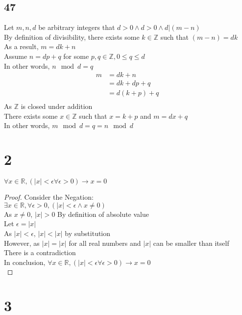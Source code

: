 \documentclass{article}
\begin{document}
\subsection{47}
Let $m,n, d$ be arbitrary integers that $d>0 \wedge d > 0 \wedge d|(m-n)$\\
By definition of divisibility, there exists some $k\in \mathbb{Z}$ such that $(m-n) = dk$\\
As a result, $m = dk + n$\\
Assume $n = dp + q$ for some $p,q\in \mathbb{Z}, 0 \leq q \leq d$\\
In other words, $n \mod d = q$\\
\begin{align*}
    m &= dk + n\\
    &= dk + dp + q \tag{By substitution}\\
    &= d(k + p) + q \tag{By algebra}\\
\end{align*}
As $\mathbb{Z}$ is closed under addition\\
There exists some $x \in \mathbb{Z}$ such that $x = k + p$ and $m = dx + q$\\
In other words, $m \mod d = q = n \mod d$\\
\section{2}
$\forall x \in \mathbb{R}, (|x| < \epsilon \forall \epsilon > 0) \rightarrow x = 0$\\
\begin{proof}
Consider the Negation:\\
$\exists x \in \mathbb{R}, \forall \epsilon > 0,(|x| < \epsilon \wedge x \neq 0)$\\
As $x \neq 0$, $|x| > 0$ By definition of absolute value\\
Let $\epsilon = |x|$\\
As $|x| < \epsilon$, $|x| < |x|$ by substitution\\
However, as $|x| = |x|$ for all real numbers and $|x|$ can be smaller than itself\\
There is a contradiction \\
In conclusion, $\forall x \in \mathbb{R}, (|x| < \epsilon \forall \epsilon > 0) \rightarrow x = 0$\\
\end{proof}

\section{3}
\end{document}

